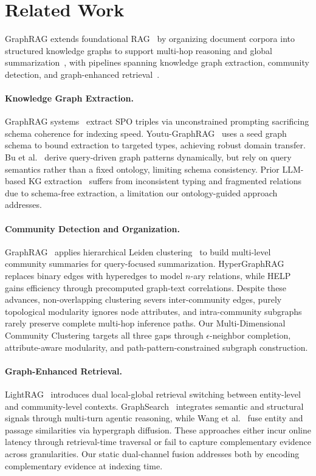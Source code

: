 \documentclass[11pt]{article}
\begin{document}
\section{Related Work}

GraphRAG extends foundational RAG~\citep{9,10} by organizing document corpora into structured knowledge graphs to support multi-hop reasoning and global summarization~\citep{7}, with pipelines spanning knowledge graph extraction, community detection, and graph-enhanced retrieval~\citep{2,3,8}.

\paragraph{Knowledge Graph Extraction.}
GraphRAG systems~\citep{7,4} extract SPO triples via unconstrained prompting sacrificing schema coherence for indexing speed. Youtu-GraphRAG~\citep{dong2026youtu} uses a seed graph schema to bound extraction to targeted types, achieving robust domain transfer. Bu et al.~\citep{bu2025querydriven} derive query-driven graph patterns dynamically, but rely on query semantics rather than a fixed ontology, limiting schema consistency. Prior LLM-based KG extraction~\citep{5,11} suffers from inconsistent typing and fragmented relations due to schema-free extraction, a limitation our ontology-guided approach addresses.

\paragraph{Community Detection and Organization.}
GraphRAG~\citep{7} applies hierarchical Leiden clustering~\citep{6} to build multi-level community summaries for query-focused summarization. HyperGraphRAG~\citep{luo2025hypergraphrag} replaces binary edges with hyperedges to model $n$-ary relations, while HELP~\citep{huang2026help} gains efficiency through precomputed graph-text correlations. Despite these advances, non-overlapping clustering severs inter-community edges, purely topological modularity ignores node attributes, and intra-community subgraphs rarely preserve complete multi-hop inference paths. Our Multi-Dimensional Community Clustering targets all three gaps through $\epsilon$-neighbor completion, attribute-aware modularity, and path-pattern-constrained subgraph construction.

\paragraph{Graph-Enhanced Retrieval.}
LightRAG~\citep{4} introduces dual local-global retrieval switching between entity-level and community-level contexts. GraphSearch~\citep{yang2025graphsearch} integrates semantic and structural signals through multi-turn agentic reasoning, while Wang et al.~\citep{wang2026hypergraph} fuse entity and passage similarities via hypergraph diffusion. These approaches either incur online latency through retrieval-time traversal or fail to capture complementary evidence across granularities. Our static dual-channel fusion addresses both by encoding complementary evidence at indexing time.
\end{document}
